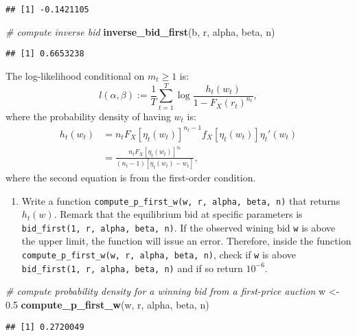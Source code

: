 \documentclass[
]{book}
\newenvironment{Shaded}{\begin{snugshade}}{\end{snugshade}}
\newcommand{\CommentTok}[1]{\textcolor[rgb]{0.56,0.35,0.01}{\textit{#1}}}
\newcommand{\FloatTok}[1]{\textcolor[rgb]{0.00,0.00,0.81}{#1}}
\newcommand{\KeywordTok}[1]{\textcolor[rgb]{0.13,0.29,0.53}{\textbf{#1}}}
\newcommand{\NormalTok}[1]{#1}
\newcommand{\StringTok}[1]{\textcolor[rgb]{0.31,0.60,0.02}{#1}}
\providecommand{\tightlist}{%
  \setlength{\itemsep}{0pt}\setlength{\parskip}{0pt}}
\begin{document}
\begin{verbatim}
## [1] -0.1421105
\end{verbatim}

\begin{Shaded}
\begin{Highlighting}[]
\CommentTok{# compute inverse bid}
\KeywordTok{inverse_bid_first}\NormalTok{(b, r, alpha, beta, n)}
\end{Highlighting}
\end{Shaded}

\begin{verbatim}
## [1] 0.6653238
\end{verbatim}

The log-likelihood conditional on \(m_t \ge 1\) is:
\[
l(\alpha, \beta) := \frac{1}{T}\sum_{t = 1}^T \log \frac{h_t(w_t)}{1 - F_X(r_t)^{n_t}},
\]
where the probability density of having \(w_t\) is:
\[
\begin{split}
h_t(w_t) &= n_t F_X[\eta_t(w_t)]^{n_t - 1} f_X[\eta_t(w_t)] \eta_t'(w_t)\\
&= \frac{n_t F_X[\eta_t(w_t)]^{n_t}}{(n_t - 1)[\eta_t(w_t) - w_t]},
\end{split}
\]
where the second equation is from the first-order condition.

\begin{enumerate}
\def\labelenumi{\arabic{enumi}.}
\setcounter{enumi}{5}
\tightlist
\item
  Write a function \texttt{compute\_p\_first\_w(w,\ r,\ alpha,\ beta,\ n)} that returns \(h_t(w)\). Remark that the equilibrium bid at specific parameters is \texttt{bid\_first(1,\ r,\ alpha,\ beta,\ n)}. If the observed wining bid \texttt{w} is above the upper limit, the function will issue an error. Therefore, inside the function \texttt{compute\_p\_first\_w(w,\ r,\ alpha,\ beta,\ n)}, check if \texttt{w} is above \texttt{bid\_first(1,\ r,\ alpha,\ beta,\ n)} and if so return \(10^{-6}\).
\end{enumerate}

\begin{Shaded}
\begin{Highlighting}[]
\CommentTok{# compute probability density for a winning bid from a first-price auction}
\NormalTok{w <-}\StringTok{ }\FloatTok{0.5}
\KeywordTok{compute_p_first_w}\NormalTok{(w, r, alpha, beta, n)}
\end{Highlighting}
\end{Shaded}

\begin{verbatim}
## [1] 0.2720049
\end{verbatim}
\end{document}
